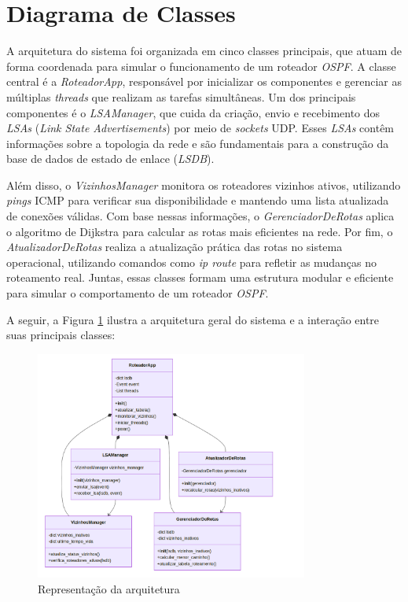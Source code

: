\documentclass[12pt,a4paper]{report}
\begin{document}
\section{Diagrama de Classes}
A arquitetura do sistema foi organizada em cinco classes principais, que atuam de forma coordenada para simular o funcionamento de um roteador \textit{OSPF}. A classe central é a \textit{RoteadorApp}, responsável por inicializar os componentes e gerenciar as múltiplas \textit{threads} que realizam as tarefas simultâneas. Um dos principais componentes é o \textit{LSAManager}, que cuida da criação, envio e recebimento dos \textit{LSAs} (\textit{Link State Advertisements}) por meio de \textit{sockets} UDP. Esses \textit{LSAs} contêm informações sobre a topologia da rede e são fundamentais para a construção da base de dados de estado de enlace (\textit{LSDB}).

Além disso, o \textit{VizinhosManager} monitora os roteadores vizinhos ativos, utilizando \textit{pings} ICMP para verificar sua disponibilidade e mantendo uma lista atualizada de conexões válidas. Com base nessas informações, o \textit{GerenciadorDeRotas} aplica o algoritmo de Dijkstra para calcular as rotas mais eficientes na rede. Por fim, o \textit{AtualizadorDeRotas} realiza a atualização prática das rotas no sistema operacional, utilizando comandos como \textit{ip route} para refletir as mudanças no roteamento real. Juntas, essas classes formam uma estrutura modular e eficiente para simular o comportamento de um roteador \textit{OSPF}.

A seguir, a Figura \ref{fig:classes} ilustra a arquitetura geral do sistema e a interação entre suas principais classes:

\begin{figure}[h!]
    \centering
    \includegraphics[width=0.8\textwidth]{diagrama_classes.png}
    \caption{Representação da arquitetura}
    \label{fig:classes}
\end{figure}
\end{document}
